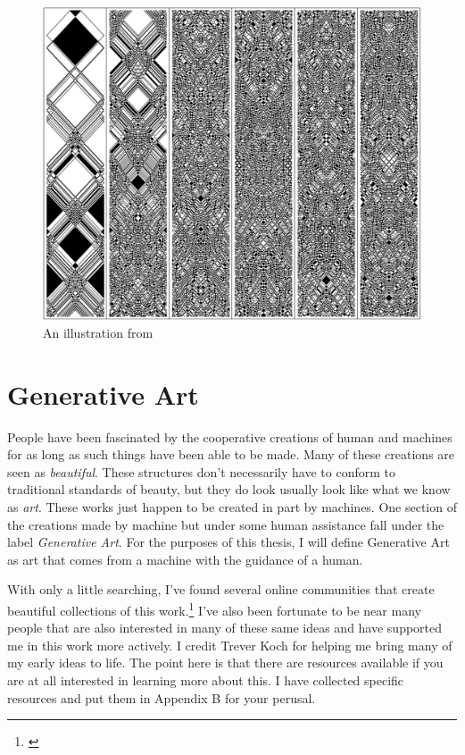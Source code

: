 \documentclass[12pt,twoside]{reedthesis}
\begin{document}
	\begin{figure}[H]
	\centering
	\includegraphics[width=0.6\linewidth]{Images/Wolfram}
	\caption{An illustration from \cite{wolfram2002}}
	\label{Wolfram}
	\end{figure}

\section{Generative Art}
\label{GenerativeArt}

	People have been fascinated by the cooperative creations of human and machines for as long as such things have been able to be made. Many of these creations are seen as \textit{beautiful}. These structures don't necessarily have to conform to traditional standards of beauty, but they do look usually look like what we know as \textit{art}. These works just happen to be created in part by machines. One section of the creations made by machine but under some human assistance fall under the label \textit{Generative Art}. For the purposes of this thesis, I will define Generative Art as art that comes from a machine with the guidance of a human.
	
	With only a little searching, I've found several online communities that create beautiful collections of this work.\footnote{\cite{reddit2023}} I've also been fortunate to be near many people that are also interested in many of these same ideas and have supported me in this work more actively. I credit Trever Koch for helping me bring many of my early ideas to life. The point here is that there are resources available if you are at all interested in learning more about this. I have collected specific resources and put them in Appendix B for your perusal.
	
	
\end{document}
